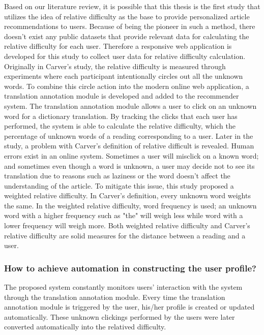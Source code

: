 Based on our literature review, it is possible that this thesis is the first study that utilizes the idea of relative difficulty as the base to provide personalized article recommendations to users. Because of being the pioneer in such a method, there doesn't exist any public datasets that provide relevant data for calculating the relative difficulty for each user. Therefore a responsive web application is developed for this study to collect user data for relative difficulty calculation. Originally in Carver's study, the relative difficulty \cite{Carver1994} is measured through experiments where each participant intentionally circles out all the unknown words. To combine this circle action into the modern online web application, a translation annotation module is developed and added to the recommender system. The translation annotation module allows a user to click on an unknown word for a dictionary translation. By tracking the clicks that each user has performed, the system is able to calculate the relative difficulty, which the percentage of unknown words of a reading corresponding to a user. Later in the study, a problem with Carver's definition of relative difficult is revealed. Human errors exist in an online system. Sometimes a user will misclick on a known word; and sometimes even though a word is unknown, a user may decide not to see its translation due to reasons such as laziness or the word doesn't affect the understanding of the article. To mitigate this issue, this study proposed a weighted relative difficulty. In Carver's definition, every unknown word weights the same. In the weighted relative difficulty, word frequency is used; an unknown word with a higher frequency such as "the" will weigh less while word with a lower frequency will weigh more. Both weighted relative difficulty and Carver's relative difficulty are solid measures for the distance between a reading and a user.

\subsubsection{How to achieve automation in constructing the user profile?}
\vspace{10pt}

The proposed system constantly monitors users' interaction with the system through the translation annotation module. Every time the translation annotation module is triggered by the user, his/her profile is created or updated automatically. These unknown clickings performed by the users were later converted automatically into the relatived difficulty.

